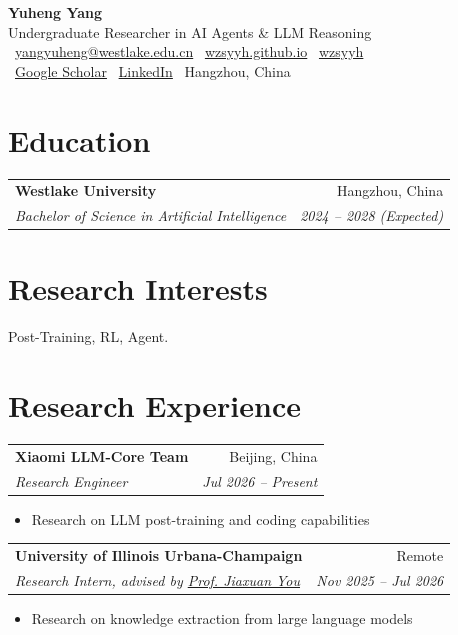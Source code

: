 \documentclass[letterpaper,11pt]{article}
\makeatletter
\newcommand{\resumeSubheading}[4]{
  \vspace{4pt}
  \begin{tabular*}{\textwidth}[t]{l@{\extracolsep{\fill}}r}
    \textbf{#1} & #2 \\
    \textit{#3} & \textit{#4} \\
  \end{tabular*}\vspace{-4pt}
}
\newcommand{\resumeItem}[1]{\item #1\vspace{-2pt}}
\makeatother
\begin{document}
\begin{center}
  {\LARGE\bfseries Yuheng Yang}\\\vspace{4pt}
  Undergraduate Researcher in AI Agents \& LLM Reasoning\\\vspace{6pt}
  \faEnvelope\ \href{mailto:yangyuheng@westlake.edu.cn}{yangyuheng@westlake.edu.cn} \quad
  \faGlobe\ \href{https://wzsyyh.github.io}{wzsyyh.github.io} \quad
  \faGithub\ \href{https://github.com/wzsyyh}{wzsyyh}\\
  \aiGoogleScholar\ \href{https://scholar.google.com/citations?user=BlTtSUkAAAAJ}{Google Scholar} \quad
  \faLinkedin\ \href{https://www.linkedin.com/in/yangyuheng/}{LinkedIn} \quad
  \faMapMarker*\ Hangzhou, China
\end{center}

\section{Education}
\resumeSubheading
  {Westlake University}{Hangzhou, China}
  {Bachelor of Science in Artificial Intelligence}{2024 -- 2028 (Expected)}

\section{Research Interests}
Post-Training, RL, Agent.

\section{Research Experience}

\resumeSubheading
  {Xiaomi LLM-Core Team}{Beijing, China}
  {Research Engineer}{Jul 2026 -- Present}
\begin{itemize}[leftmargin=1.5em, topsep=2pt, itemsep=0pt]
  \resumeItem{Research on LLM post-training and coding capabilities}
\end{itemize}

\resumeSubheading
  {University of Illinois Urbana-Champaign}{Remote}
  {Research Intern, advised by \href{https://jiaxuan.web.illinois.edu/}{Prof. Jiaxuan You}}{Nov 2025 -- Jul 2026}
\begin{itemize}[leftmargin=1.5em, topsep=2pt, itemsep=0pt]
  \resumeItem{Research on knowledge extraction from large language models}
\end{itemize}
\end{document}
